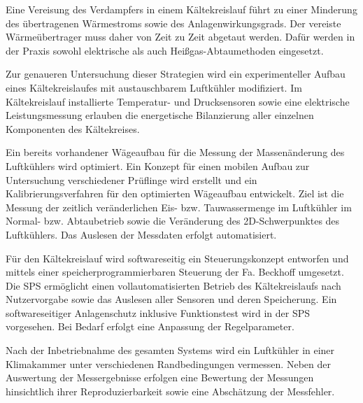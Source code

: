 Eine Vereisung des Verdampfers in einem Kältekreislauf führt zu einer Minderung des übertragenen Wärmestroms sowie des Anlagenwirkungsgrads. Der vereiste Wärmeübertrager muss daher von Zeit zu Zeit abgetaut werden. Dafür werden in der Praxis sowohl elektrische als auch Heißgas-Abtaumethoden eingesetzt.

Zur genaueren Untersuchung dieser Strategien wird ein experimenteller Aufbau eines Kältekreislaufes mit austauschbarem Luftkühler modifiziert. Im Kältekreislauf installierte Temperatur- und Drucksensoren sowie eine elektrische Leistungsmessung erlauben die energetische Bilanzierung aller einzelnen Komponenten des Kältekreises.

Ein bereits vorhandener Wägeaufbau für die Messung der Massenänderung des Luftkühlers wird optimiert. Ein Konzept für einen mobilen Aufbau zur Untersuchung verschiedener Prüflinge wird erstellt und ein Kalibrierungsverfahren für den optimierten Wägeaufbau entwickelt. Ziel ist die Messung der zeitlich veränderlichen Eis- bzw. Tauwassermenge im Luftkühler im Normal- bzw. Abtaubetrieb sowie die Veränderung des 2D-Schwerpunktes des Luftkühlers. Das Auslesen der Messdaten erfolgt automatisiert.

Für den Kältekreislauf wird softwareseitig ein Steuerungskonzept entworfen und mittels einer speicherprogrammierbaren Steuerung der Fa. Beckhoff umgesetzt. Die SPS ermöglicht einen vollautomatisierten Betrieb des Kältekreislaufs nach Nutzervorgabe sowie das Auslesen aller Sensoren und deren Speicherung. Ein softwareseitiger Anlagenschutz inklusive Funktionstest wird in der SPS vorgesehen. Bei Bedarf erfolgt eine Anpassung der Regelparameter.
 
Nach der Inbetriebnahme des gesamten Systems wird ein Luftkühler in einer Klimakammer unter verschiedenen Randbedingungen vermessen. Neben der Auswertung der Messergebnisse erfolgen eine Bewertung der Messungen hinsichtlich ihrer Reproduzierbarkeit sowie eine Abschätzung der Messfehler.


